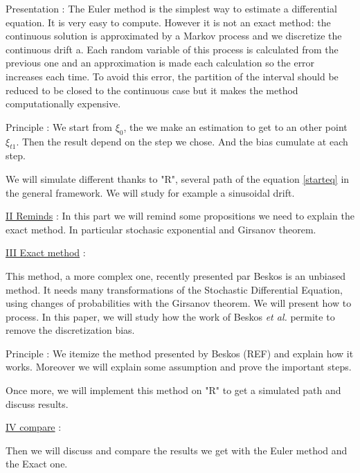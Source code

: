 Presentation : The Euler method is the simplest way to estimate a differential equation. It is very easy to compute. However it is not an exact method: the continuous solution is approximated by a Markov process and we discretize the continuous drift a. Each random variable of this process is calculated from the previous one and an approximation is made each calculation so the error increases each time. To avoid this error, the partition of the interval should be reduced to be closed to the continuous case but it makes the method computationally expensive.

Principle : We start from $\xi_{0}$, the we make an estimation to get to an other point $\xi_{t1}$. Then the result depend on the step we chose. And the bias cumulate at each step.

We will simulate different thanks to "R", several path of the equation \ref{starteq} in the general framework. We will study for example a sinusoidal drift. 


\vspace{2em}
\underline{II Reminds} : 
In this part we will remind some propositions we need to explain the exact method. In particular stochasic exponential and Girsanov theorem. 

\vspace{2em}
\underline{III Exact method} : 

This method, a more complex one, recently presented par Beskos is an unbiased method. It needs many transformations of the Stochastic Differential Equation, using changes of probabilities with the Girsanov theorem. We will present how to process.
 In this paper, we will study how the work of Beskos \textit{et al.} permite to remove the discretization bias.

Principle : We itemize the method presented by Beskos (REF) and explain how it works. Moreover we will explain some assumption and prove the important steps.

Once more, we will implement this method on "R" to get a simulated path and discuss results.

\vspace{2em}
\underline{IV compare} :

Then we will discuss and compare the results we get with the Euler method and the Exact one. 



